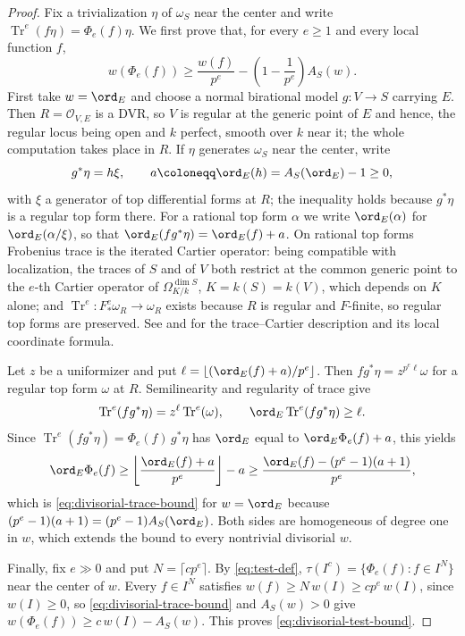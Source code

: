 \documentclass[11pt,a4paper]{article}
\begin{document}
\begin{proof}
Fix a trivialization $\eta$ of $\omega_S$ near the center and write $\operatorname{Tr}^e(f\eta)=\Phi_e(f)\eta$.  We first prove that, for every $e\geq1$ and every local function $f$,
\begin{equation}\label{eq:divisorial-trace-bound}
 w(\Phi_e(f))\geq\frac{w(f)}{p^e}
               -\left(1-\frac1{p^e}\right)A_S(w).
\end{equation}
First take $w=\ord_E$ and choose a normal birational model $g\colon V\to S$ carrying $E$.  Then $R=\mathcal O_{V,E}$ is a DVR, so $V$ is regular at the generic point of $E$ and hence, the regular locus being open and $k$ perfect, smooth over $k$ near it; the whole computation takes place in $R$.  If $\eta$ generates $\omega_S$ near the center, write
\[
 g^*\eta=h\xi,\qquad
 a\coloneqq\ord_E(h)=A_S(\ord_E)-1\geq0,
\]
with $\xi$ a generator of top differential forms at $R$; the inequality holds because $g^*\eta$ is a regular top form there.  For a rational top form $\alpha$ we write $\ord_E(\alpha)$ for $\ord_E(\alpha/\xi)$, so that $\ord_E(fg^*\eta)=\ord_E(f)+a$.  On rational top forms Frobenius trace is the iterated Cartier operator: being compatible with localization, the traces of $S$ and of $V$ both restrict at the common generic point to the $e$-th Cartier operator of $\Omega^{\dim S}_{K/k}$, $K=k(S)=k(V)$, which depends on $K$ alone; and $\operatorname{Tr}^e\colon F^e_*\omega_R\to\omega_R$ exists because $R$ is regular and $F$-finite, so regular top forms are preserved. See \cite[\S3]{MustataTest} and \cite{SchwedeTucker} for the trace--Cartier description and its local coordinate formula.

Let $z$ be a uniformizer and put $\ell=\lfloor(\ord_E(f)+a)/p^e\rfloor$.  Then $fg^*\eta=z^{p^e\ell}\omega$ for a regular top form $\omega$ at $R$. Semilinearity and regularity of trace give
\[
 \operatorname{Tr}^e(fg^*\eta)=z^\ell\operatorname{Tr}^e(\omega),
 \qquad \ord_E\operatorname{Tr}^e(fg^*\eta)\geq\ell.
\]
Since $\operatorname{Tr}^e(fg^*\eta)=\Phi_e(f)\,g^*\eta$ has $\ord_E$ equal to $\ord_E\Phi_e(f)+a$, this yields
\[
 \ord_E\Phi_e(f)
 \geq\left\lfloor\frac{\ord_E(f)+a}{p^e}\right\rfloor-a
 \geq\frac{\ord_E(f)-(p^e-1)(a+1)}{p^e},
\]
which is \eqref{eq:divisorial-trace-bound} for $w=\ord_E$ because $(p^e-1)(a+1)=(p^e-1)A_S(\ord_E)$.  Both sides are homogeneous of degree one in $w$, which extends the bound to every nontrivial divisorial $w$.

Finally, fix $e\gg0$ and put $N=\lceil cp^e\rceil$. By \eqref{eq:test-def}, $\tau(I^c)=\{\Phi_e(f):f\in I^N\}$ near the center of $w$. Every $f\in I^N$ satisfies $w(f)\geq N\,w(I)\geq cp^e\,w(I)$, since $w(I)\geq0$, so \eqref{eq:divisorial-trace-bound} and $A_S(w)>0$ give $w(\Phi_e(f))\geq c\,w(I)-A_S(w)$. This proves \eqref{eq:divisorial-test-bound}.
\end{proof}
\end{document}
